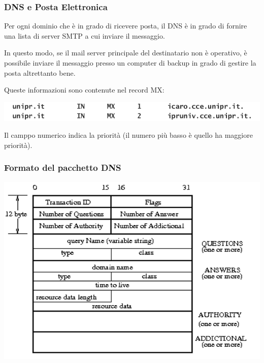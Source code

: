         \subsubsection{DNS e Posta Elettronica}
            Per ogni dominio che è in grado di ricevere posta, il DNS è in grado di fornire una lista di server SMTP a cui inviare il messaggio.
        
            In questo modo, se il mail server principale del destinatario non è operativo, è possibile inviare il messaggio presso un computer di backup in grado di gestire la posta altrettanto bene.
        
            Queste informazioni sono contenute nel record MX:
            \begin{center}
                \includegraphics[scale=0.35]{chapters/6/assets/schema_d.png}
            \end{center}

            Il camppo numerico indica la priorità (il numero più basso è quello ha maggiore priorità).

        \subsubsection{Formato del pacchetto DNS}
            \begin{center}
                \includegraphics[scale=0.45]{chapters/6/assets/schema_e.png}
            \end{center}

